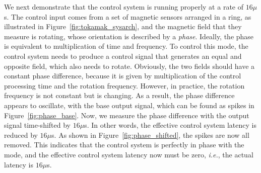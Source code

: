 We next demonstrate that the control system is running properly at a
rate of $16\mu$s.
The control input comes from a set of magnetic sensors arranged in a
ring, as illustrated in Figure~\ref{fig:tokamak_sysarch}, and the
magnetic field that they measure is rotating, whose orientation is
described by a \textit{phase}.
Ideally, the phase is equivalent to multiplication of time and
frequency.
To control this mode, the control system needs to produce a control
signal that generates an equal and opposite field, which also needs to
rotate.
Obviously, the two fields should have a constant phase difference,
because it is given by multiplication of the control processing time and
the rotation frequency.
However, in practice, the rotation frequency is not constant but is
changing.
As a result, the phase difference appears to oscillate, with the base
output signal, which can be found as spikes in
Figure~\ref{fig:phase_base}.
Now, we measure the phase difference with the output signal time-shifted
by $16\mu$s.
In other words, the effective control system latency is reduced by
$16\mu$s.
As shown in Figure~\ref{fig:phase_shifted}, the spikes are now all
removed.
This indicates that the control system is perfectly in phase with the
mode, and the effective control system latency now must be zero,
\textit{i.e.}, the actual latency is $16\mu$s.

